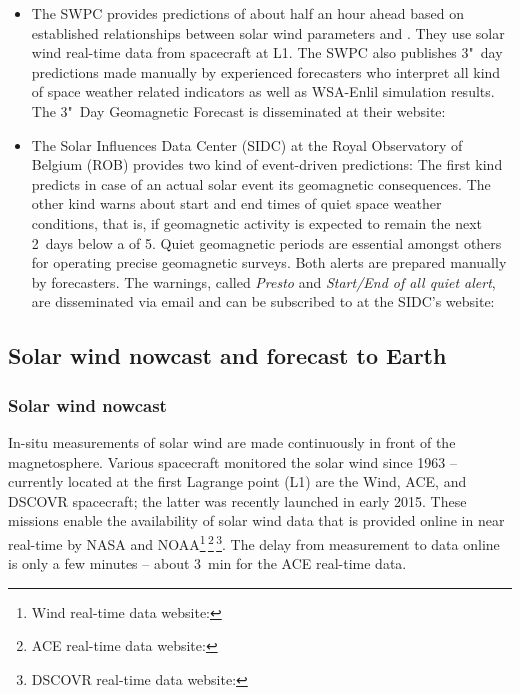 \begin{itemize}
	\item The SWPC provides \Kp{} predictions of about half an hour ahead based on established relationships between solar wind parameters and \Kp{}. They use solar wind real-time data from spacecraft at L1. The SWPC also publishes 3"~day predictions made manually by experienced forecasters who interpret all kind of space weather related indicators as well as WSA-Enlil simulation results. The 3"~Day Geomagnetic Forecast is disseminated at their website:\\
	
	\item The Solar Influences Data Center (SIDC) at the Royal Observatory of Belgium (ROB) provides two kind of event-driven \Kp{} predictions: The first kind predicts in case of an actual solar event its geomagnetic consequences. The other kind warns about start and end times of quiet space weather conditions, that is, if geomagnetic activity is expected to remain the next 2~days below a \Kp{} of 5. Quiet geomagnetic periods are essential amongst others for operating precise geomagnetic surveys. Both alerts are prepared manually by forecasters. The warnings, called \textit{Presto} and \textit{Start/End of all quiet alert}, are disseminated via email and can be subscribed to at the SIDC's website:\\
	
\end{itemize}


\subsection{Solar wind nowcast and forecast to Earth}
\label{sec:solar_wind_nowcast_and_forecast_to_earth}

\subsubsection*{Solar wind nowcast}
In-situ measurements of solar wind are made continuously in front of the magnetosphere. Various spacecraft monitored the solar wind since 1963 -- currently located at the first Lagrange point (L1) are the Wind, ACE, and DSCOVR spacecraft; the latter was recently launched in early 2015. These missions enable the availability of solar wind data that is provided online in near real-time by NASA and NOAA\footnote{Wind real-time data website: }\,\footnote{ACE real-time data website: }\,\footnote{DSCOVR real-time data website: }. The delay from measurement to data online is only a few minutes -- about \SI{3}{\minute} for the ACE real-time data.

